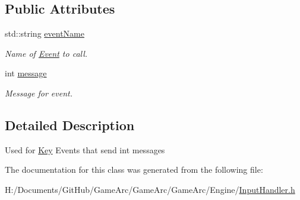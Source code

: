 \subsection*{Public Attributes}
\begin{DoxyCompactItemize}
\item 
\hypertarget{class_key_input_int_event_a6ea3160018f034b15636b45bce09a965}{std\+::string \hyperlink{class_key_input_int_event_a6ea3160018f034b15636b45bce09a965}{event\+Name}}\label{class_key_input_int_event_a6ea3160018f034b15636b45bce09a965}

\begin{DoxyCompactList}\small\item\em Name of \hyperlink{class_event}{Event} to call. \end{DoxyCompactList}\item 
\hypertarget{class_key_input_int_event_ad735d931dc2b63b235460f3de2d32490}{int \hyperlink{class_key_input_int_event_ad735d931dc2b63b235460f3de2d32490}{message}}\label{class_key_input_int_event_ad735d931dc2b63b235460f3de2d32490}

\begin{DoxyCompactList}\small\item\em Message for event. \end{DoxyCompactList}\end{DoxyCompactItemize}


\subsection{Detailed Description}
Used for \hyperlink{class_key}{Key} Events that send int messages 

The documentation for this class was generated from the following file\+:\begin{DoxyCompactItemize}
\item 
H\+:/\+Documents/\+Git\+Hub/\+Game\+Arc/\+Game\+Arc/\+Game\+Arc/\+Engine/\hyperlink{_input_handler_8h}{Input\+Handler.\+h}\end{DoxyCompactItemize}
